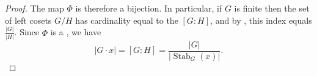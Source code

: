 \begin{proof}
    The map $\Phi$ is therefore a bijection. In particular, if $G$ is finite then the set of left cosets $G/H$ has cardinality equal to the  $[G:H]$, and by , this index equals $\frac{|G|}{|H|}$. Since $\Phi$ is a , we have
    $$|G \cdot x| = [G : H] = \frac{|G|}{|\operatorname{Stab}_G(x)|}.$$
\end{proof}
